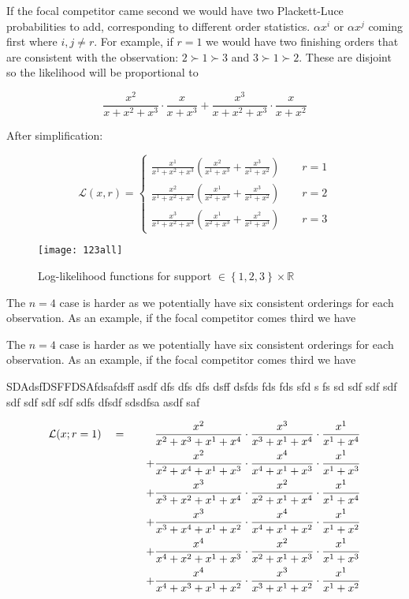 \documentclass[article]{ajs}
\begin{document}
If the focal competitor came second we would have two Plackett-Luce
probabilities to add, corresponding to different order statistics.
$\alpha x^i$ or $\alpha x^j$ coming first where $i,j\neq r$.  For
example, if $r=1$ we would have two finishing orders that are
consistent with the observation: $2\succ 1\succ 3$ and $3\succ 1\succ
2$.  These are disjoint so the likelihood will be proportional to

$$
\frac{x^2}{x+x^2+x^3}\cdot\frac{x}{x+x^3} + 
\frac{x^3}{x+x^2+x^3}\cdot\frac{x}{x+x^2}
$$

After simplification:

\begin{equation}
  \mathcal{L}(x,r)=
  \begin{cases}
    \frac{x^1}{x^1+x^2+x^3}\left(\frac{x^2}{x^1+x^3} + \frac{x^3}{x^1+x^2}\right)\qquad r=1\\
    \frac{x^2}{x^1+x^2+x^3}\left(\frac{x^1}{x^2+x^3} + \frac{x^3}{x^1+x^2}\right)\qquad r=2\\
    \frac{x^3}{x^1+x^2+x^3}\left(\frac{x^1}{x^2+x^3} + \frac{x^2}{x^1+x^3}\right)\qquad r=3
\end{cases}
\end{equation}

\begin{figure}[t]
  \begin{centering}
\texttt{[image: 123all]}  %
\caption{Log-likelihood functions \label{123all} for support
  $\in\left\lbrace 1, 2,3\right\rbrace\times\mathbb{R}$}
\end{centering}
\end{figure}


The $n=4$ case is harder as we potentially have six consistent
orderings for each observation.  As an example, if the focal
competitor comes third we have


The $n=4$ case is harder as we potentially have six consistent
orderings for each observation.  As an example, if the focal
competitor comes third we have


SDAdsfDSFFDSAfdsafdsff asdf dfs dfs dfs dsff dsfds fds fds sfd s fs sd
sdf sdf sdf sdf sdf sdf sdf sdfs dfsdf sdsdfsa asdf saf


\newcommand{\plackett}[4]{
\frac{x^{#1}}{x^{#1} + x^{#2} + x^{#3} + x^{#4}}\cdot
\frac{x^{#2}}{         x^{#2} + x^{#3} + x^{#4}}\cdot
\frac{x^{#3}}{                  x^{#3} + x^{#4}}}

\begin{eqnarray}
\mathcal{L}(x;r=1)
\quad &=& \quad\hphantom{+}
            \plackett{2}{3}{1}{4}\\
&{}&\quad + \plackett{2}{4}{1}{3}\\
&{}&\quad + \plackett{3}{2}{1}{4}\\
&{}&\quad + \plackett{3}{4}{1}{2}\\
&{}&\quad + \plackett{4}{2}{1}{3}\\
&{}&\quad + \plackett{4}{3}{1}{2}
\end{eqnarray}
\end{document}
